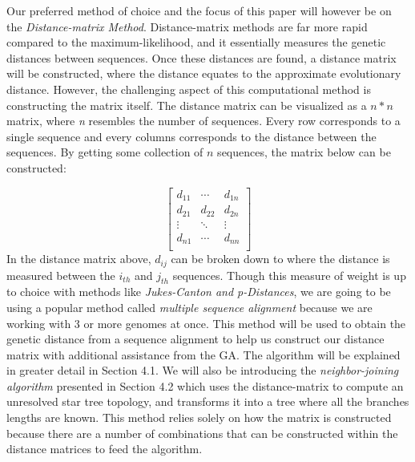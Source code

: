 Our preferred method of choice and the focus of this paper will however be on the \emph{Distance-matrix Method}. Distance-matrix methods are far more rapid compared to the maximum-likelihood, and it essentially measures the genetic distances between sequences. Once these distances are found, a distance matrix will be constructed, where the distance equates to the approximate evolutionary distance. However, the challenging aspect of this computational method is constructing the matrix itself. The distance matrix can be visualized as a $n * n$ matrix, where \emph{n} resembles the number of sequences. Every row corresponds to a single sequence and every columns corresponds to the distance between the sequences. By getting some collection of $n$ sequences, the matrix below can be constructed:

\begin{equation}
\label{Distance-matirx}
\begin{bmatrix} 
d_{11} & \cdots & d_{1n} \\
d_{21} & d_{22} & d_{2n}\\
\vdots & \ddots & \vdots\\
d_{n1} & \cdots & d_{nn} \\
\end{bmatrix}
\end{equation}       
In the distance matrix above, $d_{ij}$ can be broken down to where the distance is measured between the $i_{th}$ and $j_{th}$ sequences. Though this measure of weight is up to choice with methods like \emph{Jukes-Canton and p-Distances}, we are going to be using a popular method called \emph{multiple sequence alignment} because we are working with 3 or more genomes at once. This method will be used to obtain the genetic distance from a sequence alignment to help us construct our distance matrix with additional assistance from the GA. The algorithm will be explained in greater detail in Section 4.1. We will also be introducing the \emph{neighbor-joining algorithm} presented in Section 4.2 which uses the distance-matrix to compute an unresolved star tree topology, and transforms it into a tree where all the branches lengths are known. This method relies solely on how the matrix is constructed because there are a number of combinations that can be constructed within the distance matrices to feed the algorithm.      
 
